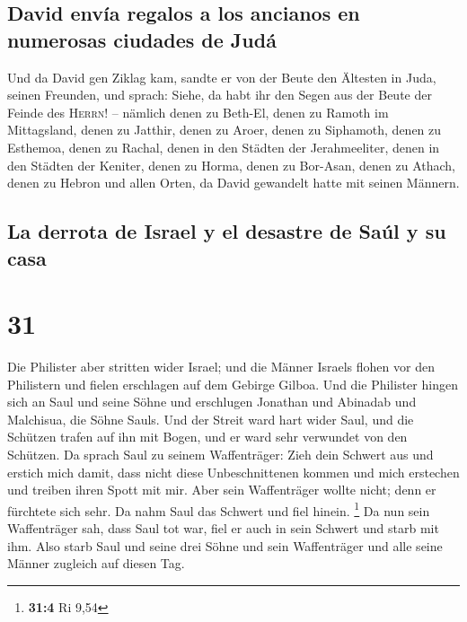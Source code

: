 \hypertarget{david-envuxeda-regalos-a-los-ancianos-en-numerosas-ciudades-de-juduxe1}{%
\subsection{David envía regalos a los ancianos en numerosas ciudades de
Judá}\label{david-envuxeda-regalos-a-los-ancianos-en-numerosas-ciudades-de-juduxe1}}

 Und da David gen Ziklag kam, sandte er von der Beute den
Ältesten in Juda, seinen Freunden, und sprach: Siehe, da habt ihr den
Segen aus der Beute der Feinde des \textsc{Herrn}! -- 
nämlich denen zu Beth-El, denen zu Ramoth im Mittagsland, denen zu
Jatthir,  denen zu Aroer, denen zu Siphamoth, denen zu
Esthemoa,  denen zu Rachal, denen in den Städten der
Jerahmeeliter, denen in den Städten der Keniter,  denen
zu Horma, denen zu Bor-Asan, denen zu Athach,  denen zu
Hebron und allen Orten, da David gewandelt hatte mit seinen Männern.

\hypertarget{la-derrota-de-israel-y-el-desastre-de-sauxfal-y-su-casa}{%
\subsection{La derrota de Israel y el desastre de Saúl y su
casa}\label{la-derrota-de-israel-y-el-desastre-de-sauxfal-y-su-casa}}

\hypertarget{section-30}{%
\section{31}\label{section-30}}

 Die Philister aber stritten wider Israel; und die Männer
Israels flohen vor den Philistern und fielen erschlagen auf dem Gebirge
Gilboa.  Und die Philister hingen sich an Saul und seine
Söhne und erschlugen Jonathan und Abinadab und Malchisua, die Söhne
Sauls.  Und der Streit ward hart wider Saul, und die
Schützen trafen auf ihn mit Bogen, und er ward sehr verwundet von den
Schützen.  Da sprach Saul zu seinem Waffenträger: Zieh
dein Schwert aus und erstich mich damit, dass nicht diese
Unbeschnittenen kommen und mich erstechen und treiben ihren Spott mit
mir. Aber sein Waffenträger wollte nicht; denn er fürchtete sich sehr.
Da nahm Saul das Schwert und fiel hinein. \footnote{\textbf{31:4} Ri
  9,54}  Da nun sein Waffenträger sah, dass Saul tot war,
fiel er auch in sein Schwert und starb mit ihm.  Also
starb Saul und seine drei Söhne und sein Waffenträger und alle seine
Männer zugleich auf diesen Tag.

